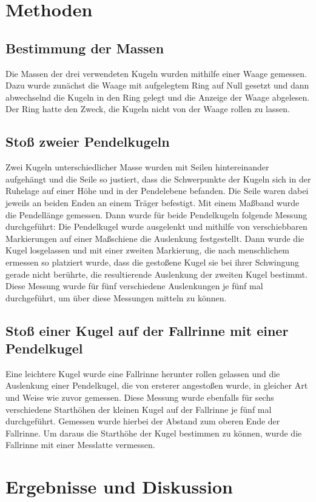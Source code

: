 \documentclass[
	a4paper,
	12pt,
	pagesize,
	ngerman
]{scrartcl}
\begin{document}
	\section{Methoden}
	\subsection{Bestimmung der Massen}
	Die Massen der drei verwendeten Kugeln wurden mithilfe einer Waage gemessen.
	Dazu wurde zunächst die Waage mit aufgelegtem Ring auf Null gesetzt und dann abwechselnd die Kugeln in den Ring gelegt und die Anzeige der Waage abgelesen.
	Der Ring hatte den Zweck, die Kugeln nicht von der Waage rollen zu lassen.
	
	\subsection{Stoß zweier Pendelkugeln} 
	Zwei Kugeln unterschiedlicher Masse wurden mit Seilen hintereinander aufgehängt und die Seile so justiert, dass die Schwerpunkte der Kugeln sich in der Ruhelage auf einer Höhe und in der Pendelebene befanden.
	Die Seile waren dabei jeweils an beiden Enden an einem Träger befestigt.
	Mit einem Maßband wurde die Pendellänge gemessen.
	Dann wurde für beide Pendelkugeln folgende Messung durchgeführt:
	Die Pendelkugel wurde ausgelenkt und mithilfe von verschiebbaren Markierungen auf einer Maßschiene die Auslenkung festgestellt.
	Dann wurde die Kugel losgelassen und mit einer zweiten Markierung, die nach menschlichem ermessen so platziert wurde, dass die gestoßene Kugel sie bei ihrer Schwingung gerade nicht berührte, die resultierende Auslenkung der zweiten Kugel bestimmt.
	Diese Messung wurde für fünf verschiedene Auslenkungen je fünf mal durchgeführt, um über diese Messungen mitteln zu können.
	\subsection{Stoß einer Kugel auf der Fallrinne mit einer Pendelkugel}
	Eine leichtere Kugel wurde eine Fallrinne herunter rollen gelassen und die Auslenkung einer Pendelkugel, die von ersterer angestoßen wurde, in gleicher Art und Weise wie zuvor gemessen.
	Diese Messung wurde ebenfalls für sechs verschiedene Starthöhen der kleinen Kugel auf der Fallrinne je fünf mal durchgeführt.
	Gemessen wurde hierbei der Abstand zum oberen Ende der Fallrinne.
	Um daraus die Starthöhe der Kugel bestimmen zu können, wurde die Fallrinne mit einer Messlatte vermessen.
	
	
	\section{Ergebnisse und Diskussion}
	
\end{document}
